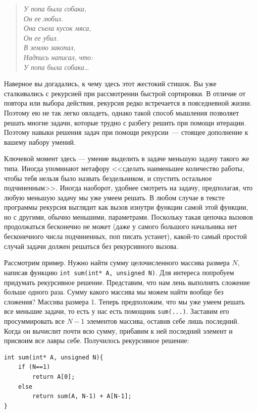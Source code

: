 \documentclass{article}
\begin{document}
\newpage
\begin{verse}
\small\it
У попа была собака,\\
Он ее любил.\\
Она съела кусок мяса,\\
Он ее убил.\\
В землю закопал, \\
Надпись написал, что:\\
У попа была собака\ldots
\end{verse}

Наверное вы догадались, к чему здесь этот жестокий стишок. Вы уже сталкивались с рекурсией при рассмотрении быстрой сортировки. В отличие от повтора или выбора действия, рекурсия редко встречается в повседневной жизни. Поэтому ею не так легко овладеть, однако такой способ мышления позволяет решать многие задачи, которые трудно с разбегу решить при помощи итерации. Поэтому навыки решения задач при помощи рекурсии~--- стоящее дополнение к вашему набору умений. 

Ключевой момент здесь --- умение выделить в задаче меньшую задачу такого же типа. Иногда упоминают метафору <<сделать наименьшее количество работы, чтобы тебя нельзя было назвать бездельником, и спустить остальное подчиненным>>. Иногда наоборот, удобнее смотреть на задачу, предполагая, что любую меньшую задачу мы уже умеем решать. В любом случае в тексте программы рекурсия выглядит как вызов изнутри функции самой этой функции, но с другими, обычно меньшими, параметрами. Поскольку такая цепочка вызовов продолжаться бесконечно не может (даже у самого большого начальника нет бесконечного числа подчиненных, поп писать устанет), какой-то самый простой случай задачи должен решаться без рекурсивного вызова.

Рассмотрим пример. Нужно найти сумму целочисленного массива размера $N$, написав функцию \texttt{int sum(int* A, unsigned N)}. Для интереса попробуем придумать рекурсивное решение. Представим, что нам лень выполнять сложение больше одного раза. Сумму какого массива мы можем найти вообще без сложения? Массива размера 1. Теперь предположим, что мы уже умеем решать все меньшие задачи, то есть у нас есть помощник \texttt{sum(...)}. Заставим его просуммировать все $N-1$ элементов массива, оставив себе лишь последний. Когда он вычислит почти всю сумму, прибавим к ней последний элемент и присвоим все лавры себе. Получилось рекурсивное решение:
\begin{verbatim}
int sum(int* A, unsigned N){
    if (N==1)
        return A[0];
    else
        return sum(A, N-1) + A[N-1];
}
\end{verbatim}
\end{document}
